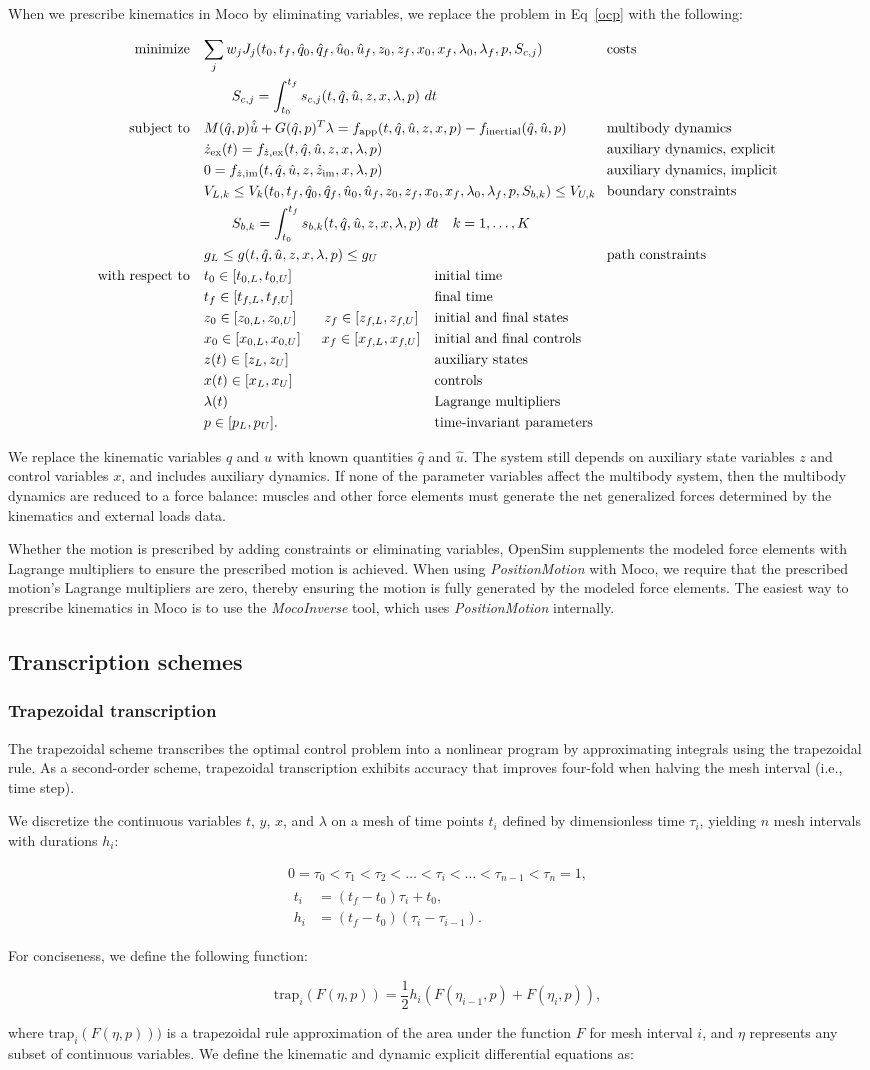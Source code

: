 \documentclass[10pt,letterpaper]{article}
\newcommand{\prescribed}{
\begin{adjustwidth}{-1.125in}{-1.125in} %
\begin{align}
    \begin{aligned}
        \mbox{minimize} \quad & \mathrlap{\sum_j w_j J_{j}(t_0, t_f, \hat{q}_0, \hat{q}_f, \hat{u}_0, \hat{u}_f, z_0, z_f, x_{0}, x_{f}, \lambda_0, \lambda_f, p, S_{c,j})} &&&& \textrm{costs} \\
        & \quad\quad \mathrlap{S_{c,j} = \int_{t_0}^{t_f} s_{c,j}(t, \hat{q}, \hat{u}, z, x, \lambda, p)~dt} \\
        \mbox{subject to} \quad &
         M(\hat{q}, p)\hat{\dot{u}} + \mathrlap{G(\hat{q}, p)^T \lambda = f_{\textrm{app}}(t, \hat{q}, \hat{u}, z, x, p) - f_{\textrm{inertial}}(\hat{q}, \hat{u}, p)} &&&& \textrm{multibody dynamics} \\
        & \mathrlap{\dot{z}_{\textrm{ex}}(t) = f_{\dot{z},\textrm{ex}}(t, \hat{q}, \hat{u}, z, x, \lambda, p)} &&&& \textrm{auxiliary dynamics, explicit} \\
        & \mathrlap{0 = f_{\dot{z},\textrm{im}}(t, \hat{q}, \hat{u}, z, \dot{z}_\textrm{im}, x, \lambda, p)} &&&& \textrm{auxiliary dynamics, implicit}\\
        & V_{L,k} \leq V_k(t_0, t_f, \hat{q}_0, \mathrlap{\hat{q}_f, \hat{u}_0, \hat{u}_f, z_0, z_f, x_{0}, x_{f}, \lambda_0, \lambda_f, p, S_{b,k}) \leq V_{U,k}}  &&&& \textrm{boundary constraints} \\
        & \quad\quad \mathrlap{S_{b,k} = \int_{t_0}^{t_f} s_{b,k}(t, \hat{q}, \hat{u}, z, x, \lambda, p)~dt \quad k = 1, \ldots, K} \\
        & \mathrlap{g_{L} \leq g(t, \hat{q}, \hat{u}, z, x, \lambda, p) \leq g_{U}} &&&& \textrm{path constraints} \\
        \mbox{with respect to} \quad
        & t_0 \in [t_{0,L}, t_{0,U}] && \textrm{initial time} \\
        & t_f \in [t_{f,L}, t_{f,U}] && \textrm{final time} \\
        & z_0 \in [z_{0,L}, z_{0,U}] \quad\quad z_f \in [z_{f,L}, z_{f,U}] && \textrm{initial and final states} \\
        & x_0 \in [x_{0,L}, x_{0,U}] \quad\mkern9mu x_f \in [x_{f,L}, x_{f,U}] && \textrm{initial and final controls} \\
        & z(t) \in [z_{L}, z_{U}] && \textrm{auxiliary states} \\
        & x(t) \in [x_{L}, x_{U}] && \textrm{controls} \\
        & \lambda(t) && \textrm{Lagrange multipliers} \\
        & p \in [p_{L}, p_{U}]. && \textrm{time-invariant parameters}
    \end{aligned}
\end{align}
\end{adjustwidth}
}
\newcommand{\traptau}{
\begin{equation}
    \begin{gathered}
        0 = \tau_0 < \tau_1 < \tau_2 < \ldots < \tau_i < \ldots < \tau_{n - 1} < \tau_n = 1, \\
        \begin{aligned}
        t_i &= (t_f - t_0) \tau_i + t_0, \\
        h_i &= (t_f - t_0)(\tau_i - \tau_{i-1}).
        \end{aligned}
    \end{gathered}
\end{equation}
}
\newcommand{\trapfunc}{
\begin{equation}
    \textrm{trap}_i(F(\eta, p)) = \frac{1}{2} h_i (F(\eta_{i-1}, p) + F(\eta_i, p)),
\end{equation}
}
\begin{document}
When we prescribe kinematics in Moco by eliminating variables, we replace the problem in Eq~\ref{ocp} with the following:

\prescribed

We replace the kinematic variables $q$ and $u$ with known quantities $\hat{q}$ and $\hat{u}$. The system still depends on auxiliary state variables $z$ and control variables $x$, and includes auxiliary dynamics. If none of the parameter variables affect the multibody system, then the multibody dynamics are reduced to a force balance: muscles and other force elements must generate the net generalized forces determined by the kinematics and external loads data.

Whether the motion is prescribed by adding constraints or eliminating variables, OpenSim supplements the modeled force elements with Lagrange multipliers to ensure the prescribed motion is achieved. When using \textit{PositionMotion} with Moco, we require that the prescribed motion's Lagrange multipliers are zero, thereby ensuring the motion is fully generated by the modeled force elements. The easiest way to prescribe kinematics in Moco is to use the \textit{MocoInverse} tool, which uses \textit{PositionMotion} internally.

\subsection*{Transcription schemes}

\subsubsection*{Trapezoidal transcription}

The trapezoidal scheme transcribes the optimal control problem into a nonlinear program by approximating integrals using the trapezoidal rule. As a second-order scheme, trapezoidal transcription exhibits accuracy that improves four-fold when halving the mesh interval (i.e., time step).

We discretize the continuous variables $t$, $y$, $x$, and $\lambda$ on a mesh of time points $t_i$ defined by dimensionless time $\tau_i$, yielding $n$ mesh intervals with durations $h_i$:

\traptau

For conciseness, we define the following function:

\trapfunc

where $\mathrm{trap}_i(F(\eta, p)))$ is a trapezoidal rule approximation of the area under the function $F$ for mesh interval $i$, and $\eta$ represents any subset of continuous variables. We define the kinematic and dynamic explicit differential equations as:
\end{document}
